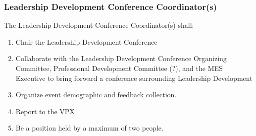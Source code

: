 
\subsubsection{Leadership Development Conference Coordinator(s)}
\label{leadership-development-conference-coordinators}
The Leadership Development Conference Coordinator(s) shall:

\begin{enumerate}
 \item
  Chair the Leadership Development Conference
 \item
  Collaborate with the Leadership Development Conference Organizing Committee, Professional Development Committee (?), and the MES Executive to bring forward a conference surrounding Leadership Development
 \item
  Organize event demographic and feedback collection.
 \item
  Report to the VPX
 \item
  Be a position held by a maximum of two people.
\end{enumerate}